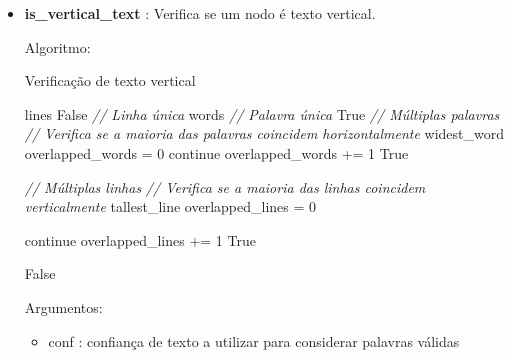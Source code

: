 \begin{itemize}
	
	\item \textbf{is\_vertical\_text} : Verifica se um nodo é texto vertical.
	
	Algoritmo: 
	
	\begin{algorithm}[H]
		\caption{Verificação de texto vertical}
		\scriptsize
		\begin{algorithmic}[1]
				\STATE lines
					\RETURN False
				\ENDIF
				\STATE \textit{// Linha única}
					\STATE words
					 \STATE \textit{// Palavra única}
							\RETURN True
						\ENDIF
					\STATE \textit{// Múltiplas palavras}
					\Else
						\STATE \textit{// Verifica se a maioria das palavras coincidem horizontalmente}
						\STATE widest\_word
						\STATE overlapped\_words = 0
								\STATE continue
							\ENDIF
								\STATE overlapped\_words += 1
							\ENDIF
						\ENDFOR
							\RETURN True
						\ENDIF
						
					\ENDIF
					
				\STATE \textit{// Múltiplas linhas}
				\Else
					\STATE \textit{// Verifica se a maioria das linhas coincidem verticalmente}
					\STATE tallest\_line
					\STATE overlapped\_lines = 0
					
							\STATE continue
						\ENDIF
							\STATE overlapped\_lines += 1
						\ENDIF
					\ENDFOR
						\RETURN True
					\ENDIF
				
				\ENDIF
				
			\ENDIF
			
			\RETURN	False
			
		\end{algorithmic}
	\end{algorithm}
	
	
	Argumentos:
	\begin{itemize}\setlength\itemsep{0.05cm}
		\item conf : confiança de texto a utilizar para considerar palavras válidas
	\end{itemize}
	
\end{itemize}




